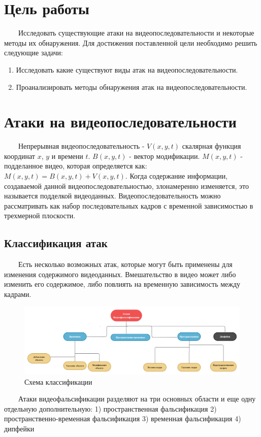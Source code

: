\documentclass[12pt]{article}
\begin{document}
    \section{Цель работы}
        $\qquad$Исследовать существующие атаки на видеопоследовательности и некоторые методы их обнаружения.
        \newline
        Для достижения поставленной цели необходимо решить следующие задачи:
        \begin{enumerate}
            \item Исследовать какие существуют виды атак на видеопоследовательности.
            \item Проанализировать методы обнаружения атак на видеопоследовательности.
       \end{enumerate}
    \newpage
    \section {Атаки на видеопоследовательности}
         $\qquad$Непрерывная видеопоследовательность - $V(x,y,t)$ скалярная функция координат $x$, $y$ и времени $t$. $B(x,y,t)$ - вектор модификации. $M(x,y,t)$ - подделанное видео, которая определяется как: $M(x,y,t) = B(x,y,t) + V (x,y,t)$. Когда содержание информации, создаваемой данной видеопоследовательностью, злонамеренно изменяется, это называется подделкой видеоданных. Видеопоследовательность можно рассматривать как набор последовательных кадров с временной зависимостью в трехмерной плоскости. 
    \subsection {Классификация атак}
        $\qquad$Есть несколько возможных атак, которые могут быть применены для изменения содержимого видеоданных. Вмешательство в видео может либо изменить его содержимое, либо повлиять на временную зависимость между кадрами.
        \newline
        \newline
        \centerline{}
        \begin{figure}[h!]
            \centering
            \includegraphics[width = 530 pt] {3_2.jpg}
            \caption{Схема классификации}
        \end{figure}
        \newline
        $\qquad$Атаки видеофальсификации разделяют на три основных области и еще одну отдельную дополнительную: 
        1) пространственная фальсификация
        2) пространственно-временная фальсификация
        3) временная фальсификация 
        4) дипфейки
        
\end{document}
